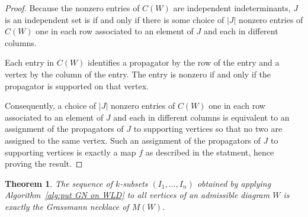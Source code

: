 \documentclass[11pt]{article}
\newtheorem{thm}{Theorem}[section]
\theoremstyle{remark}
\theoremstyle{definition}
\begin{document}
\begin{proof}
Because the nonzero entries of $C(W)$ are independent indeterminants, $J$ is an independent set is if and only if there is some choice of $|J|$ nonzero entries of $C(W)$ one in each row associated to an element of $J$ and each in different columns.

Each entry in $C(W)$ identifies a propagator by the row of the entry and a vertex by the column of the entry.  The entry is nonzero if and only if the propagator is supported on that vertex.

Consequently, a choice of $|J|$ nonzero entries of $C(W)$ one in each row associated to an element of $J$ and each in different columns is equivalent to an assignment of the propagators of $J$ to supporting vertices so that no two are assigned to the same vertex.  Such an assignment of the propagators of $J$ to supporting vertices is exactly a map $f$ as described in the statment, hence proving the result.
\end{proof}

\begin{thm}\label{res:alg gives GN}
The sequence of $k$-subsets $(I_1,\dots,I_n)$ obtained by applying Algorithm~\ref{alg:put GN on WLD} to all vertices of an admissible diagram $W$ is exactly the Grassmann necklace of $M(W)$.
\end{thm}
\end{document}
